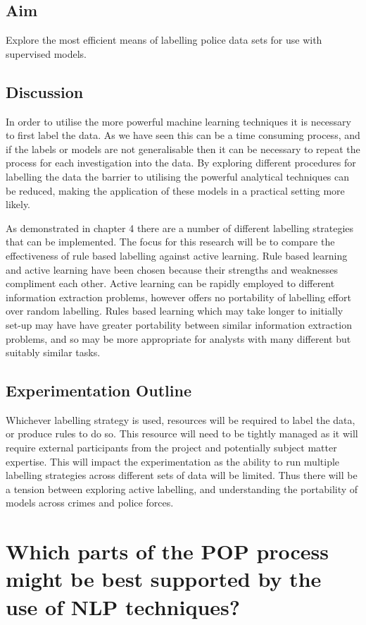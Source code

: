 \subsection{Aim} Explore the most efficient means of labelling police data sets for use with supervised models. 

\subsection{Discussion}In order to utilise the more powerful machine learning techniques it is necessary to first label the data. As we have seen this can be a time consuming process, and if the labels or models are not generalisable then it can be necessary to repeat the process for each investigation into the data. By exploring different procedures for labelling the data the barrier to utilising the powerful analytical techniques can be reduced, making the application of these models in a practical setting more likely.  

As demonstrated in chapter 4 there are a number of different labelling strategies that can be implemented. The focus for this research will  be to compare the effectiveness of rule based labelling against active learning. Rule based learning and active learning have been chosen because their strengths and weaknesses compliment each other. Active learning can be rapidly employed to different information extraction problems, however offers no portability of labelling effort over random labelling. Rules based learning which may take longer to initially set-up may have have greater portability between similar information extraction problems, and so may be more appropriate for analysts with many different but suitably similar tasks.


\subsection{Experimentation Outline} Whichever labelling strategy is used, resources will be required to label the data, or produce rules to do so. This resource will need to be tightly managed as it will require external participants from the project and potentially subject matter expertise. This will impact the experimentation as the ability to run multiple labelling strategies across different sets of data will be limited. Thus there will be a tension between exploring active labelling, and understanding the portability of models across crimes and police forces. 


\section{Which parts of the POP process might be best supported by the use of NLP techniques?}


